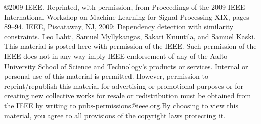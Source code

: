 \documentclass[12pt,onecolumn]{article}
\begin{document}
\noindent \copyright 2009 IEEE. Reprinted, with permission, from
  Proceedings of the 2009 IEEE International Workshop on Machine
  Learning for Signal Processing XIX, pages 89--94. IEEE, Piscataway,
  NJ, 2009: Dependency detection with similarity constraints. Leo
  Lahti, Samuel Myllykangas, Sakari Knuutila, and Samuel Kaski. This
  material is posted here with permission of the IEEE. Such permission
  of the IEEE does not in any way imply IEEE endorsement of any of the
  Aalto University School of Science and Technology's products or
  services. Internal or personal use of this material is permitted.
  However, permission to reprint/republish this material for
  advertising or promotional purposes or for creating new collective
  works for resale or redistribution must be obtained from the IEEE by
  writing to pubs-permissions@ieee.org.By choosing to view this
  material, you agree to all provisions of the copyright laws
  protecting it.
\end{document}
